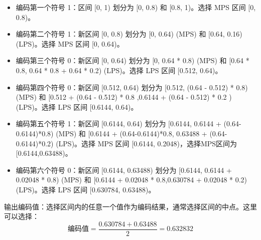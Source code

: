 \documentclass{/Users/hi/Study/template/code}
\begin{document}
\begin{tcolorbox}
\begin{serialNumber}
		\begin{itemize}
			\item 编码第一个符号 1：区间 [0, 1) 划分为 [0, 0.8) 和 [0.8, 1)。选择 MPS 区间 [0, 0.8)。
			\item 编码第二个符号 1：新区间 [0, 0.8) 划分为 [0, 0.64) (MPS) 和 [0.64, 0.16) (LPS)。选择 MPS 区间 [0, 0.64)。
			\item 编码第三个符号 0：新区间 [0, 0.64) 划分为 [0, 0.64 * 0.8) (MPS) 和 [0.64 * 0.8, 0.64 * 0.8 + 0.64 * 0.2) (LPS)。选择 LPS 区间 [0.512, 0.64)。
			\item 编码第四个符号 0：新区间 [0.512, 0.64) 划分为 [0.512, (0.64 - 0.512) * 0.8) (MPS) 和 [0.512 + (0.64 - 0.512) * 0.8 ,0.6144 + (0.64 - 0.512) * 0.2 ) (LPS)。选择 LPS 区间 [0.6144, 0.64)。
			\item 编码第五个符号 1：新区间 [0.6144, 0.64) 划分为 [0.6144, 0.6144 + (0.64-0.6144)*0.8) (MPS) 和 [0.6144 + (0.64-0.6144)*0.8, 0.63488 + (0.64-0.6144)*0.2) (LPS)。选择 MPS 区间 [0.6144, 0.2048)，选择MPS区间为 [0.6144,0.63488)。
			\item 编码第六个符号 0：新区间 [0.6144, 0.63488) 划分为 [0.6144, 0.6144 + 0.02048 * 0.8) (MPS) 和 [0.6144 + 0.02048 * 0.8,0.630784 + 0.02048 * 0.2) (LPS)。选择 LPS 区间 [0.630784, 0.63488)。
		\end{itemize}

		\item 输出编码值：选择区间内的任意一个值作为编码结果，通常选择区间的中点。这里可以选择：
		\begin{equation}
			\text{编码值} = \frac{0.630784 + 0.63488}{2} = 0.632832
		\end{equation}
	\end{serialNumber}


\end{tcolorbox}
\end{document}
